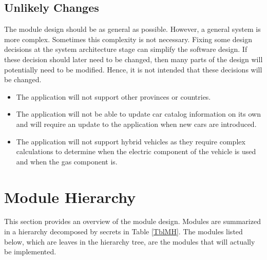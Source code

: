 \documentclass[12pt, titlepage]{article}
\newcounter{ucnum}
\newcommand{\uctheucnum}{UC\theucnum}
\begin{document}
\subsection{Unlikely Changes} \label{SecUchange}

The module design should be as general as possible. However, a general system is
more complex. Sometimes this complexity is not necessary. Fixing some design
decisions at the system architecture stage can simplify the software design. If
these decision should later need to be changed, then many parts of the design
will potentially need to be modified. Hence, it is not intended that these
decisions will be changed.

\noindent \begin{itemize}

\item[\refstepcounter{ucnum}\uctheucnum\label{Regional Support}:] The application will not support other provinces or countries.

\item[\refstepcounter{ucnum}\uctheucnum\label{New Cars}:] The application will not be able to update car catalog information on its own and will require an update to the application when new cars are introduced.

\item[\refstepcounter{ucnum}\uctheucnum\label{Hybrid Cars}:] The application will not support hybrid vehicles as they require complex calculations to determine when the electric component of the vehicle is used and when the gas component is.

\end{itemize}

\section{Module Hierarchy} \label{SecMH}

This section provides an overview of the module design. Modules are summarized
in a hierarchy decomposed by secrets in Table \ref{TblMH}. The modules listed
below, which are leaves in the hierarchy tree, are the modules that will
actually be implemented.
\end{document}
